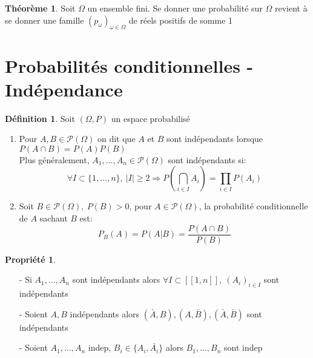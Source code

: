 \documentclass[fleqn]{article}
\theoremstyle{definition} \newtheorem*{defi}{D\'efinition}
\theoremstyle{definition} \newtheorem*{theo}{Th\'eor\`eme}
\theoremstyle{definition} \newtheorem*{coro}{Corollaire}
\theoremstyle{remark} \newtheorem*{rqs}{Remarques}
\theoremstyle{definition} \newtheorem*{prop}{Propri\'et\'e}
\begin{document}
\begin{theo}
	Soit $\Omega$ un ensemble fini. Se donner une probabilit\'e sur $\Omega$ revient \`a se donner une famille $(p_\omega)_{\omega \in \Omega}$
	de r\'eels positifs de somme 1
\end{theo}

\section{Probabilit\'es conditionnelles - Ind\'ependance}
\begin{defi} Soit $(\Omega, P)$ un espace probabilis\'e
	\begin{enumerate}
		\item Pour $A,B \in \mathcal{P}(\Omega)$ on dit que $A$ et $B$ sont ind\'ependants lorsque \\$P(A \cap B) = P(A)P(B)$\\
			Plus g\'en\'eralement, $A_1, \hdots, A_n \in \mathcal{P}(\Omega)$ sont ind\'ependants si: \[\forall I \subset \{1,
			\hdots, n\},\ |I| \geq 2 \Rightarrow P(\bigcap_{i \in I} A_i) = \prod_{i \in I} P(A_i)\]
		\item Soit $B \in \mathcal{P}(\Omega),\ P(B) > 0$, pour $A \in \mathcal{P}(\Omega)$, la probabilit\'e conditionnelle de $A$ sachant $B$
			est: \[P_B(A) = P(A|B) = \frac{P(A\cap B)}{P(B)}\]
	\end{enumerate}
\end{defi}

\begin{prop} $ $
	\begin{itemize}
		\item [-] Si $A_1, \hdots, A_n$ sont ind\'ependants alors $\forall I \subset [\![1,n]\!],\ (A_i)_{i \in I}$ sont ind\'ependants
		\item [-] Soient $A,B$ ind\'ependants alors $(\bar{A},B), (A, \bar{B}),(\bar{A}, \bar{B})$ sont ind\'ependants
		\item [-] Soient $A_1, \hdots, A_n$ indep, $B_i \in \{A_i, \bar{A_i}\}$ alors $B_1, \hdots, B_n$ sont indep
	\end{itemize}
\end{prop}
\end{document}
